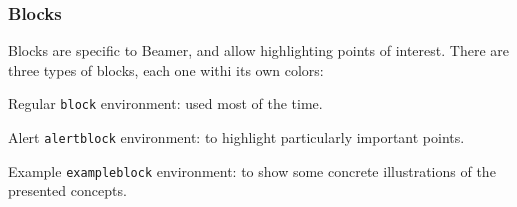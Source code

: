 \documentclass[10pt,    %
    english,            %
    xcolor=table,       %
    envcountsect,        %
    aspectratio=169     %
]{beamer}
\begin{document}
\begin{frame}
    \frametitle{Blocks}
    \label{frm:blocks}
    
    Blocks are specific to Beamer, and allow highlighting points of interest. There are three types of blocks, each one withi its own colors:

    \begin{block}{Regular}
        \texttt{block} environment: used most of the time.
    \end{block}

    \begin{alertblock}{Alert}
        \texttt{alertblock} environment: to highlight particularly important points.
    \end{alertblock}

    \begin{exampleblock}{Example}
        \texttt{exampleblock} environment: to show some concrete illustrations of the presented concepts.
    \end{exampleblock}
\end{frame}
\end{document}
